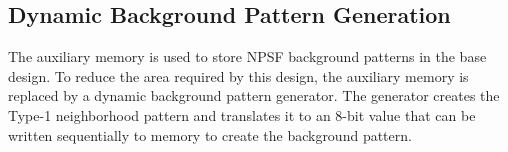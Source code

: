 \subsection{Dynamic Background Pattern Generation}
The auxiliary memory is used to store NPSF background patterns in the base design.  To reduce the area required by this design, the auxiliary memory is replaced by a dynamic background pattern generator.  The generator creates the Type-1 neighborhood pattern and translates it to an 8-bit value that can be written sequentially to memory to create the background pattern.

